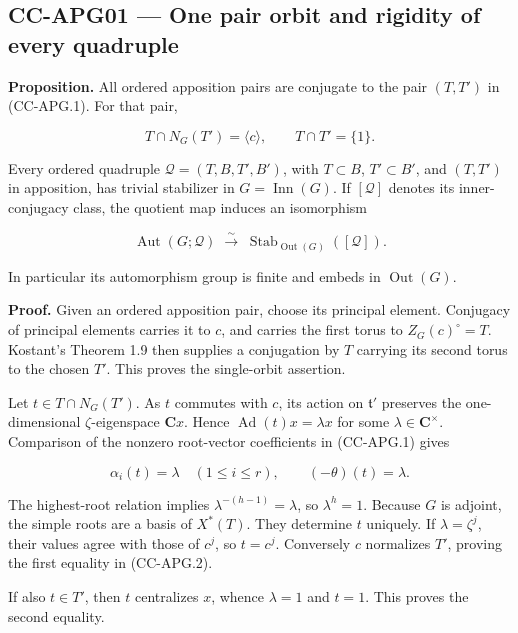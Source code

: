 \documentclass[11pt,a4paper]{article}
\theoremstyle{definition}\newtheorem{definition}[theorem]{Definition}
\theoremstyle{remark}\newtheorem{remark}[theorem]{Remark}
\begin{document}
\subsection{CC-APG01 --- One pair orbit and rigidity of every
quadruple}\label{cc-apg01-one-pair-orbit-and-rigidity-of-every-quadruple}

\textbf{Proposition.} All ordered apposition pairs are conjugate to the
pair \((T,T')\) in (CC-APG.1). For that pair,

\[
 T\cap N_G(T')=\langle c\rangle,\qquad
 T\cap T'=\{1\}.
 \tag{CC-APG.2}
\]

Every ordered quadruple \(\mathcal Q=(T,B,T',B')\), with \(T\subset B\),
\(T'\subset B'\), and \((T,T')\) in apposition, has trivial stabilizer
in \(G=\operatorname{Inn}(G)\). If \([\mathcal Q]\) denotes its
inner-conjugacy class, the quotient map induces an isomorphism

\[
 \operatorname{Aut}(G;\mathcal Q)
 \;\xrightarrow{\ \sim\ }\;
 \operatorname{Stab}_{\operatorname{Out}(G)}([\mathcal Q]).
 \tag{CC-APG.3}
\]

In particular its automorphism group is finite and embeds in
\(\operatorname{Out}(G)\).

\textbf{Proof.} Given an ordered apposition pair, choose its principal
element. Conjugacy of principal elements carries it to \(c\), and
carries the first torus to \(Z_G(c)^\circ=T\). Kostant's Theorem 1.9
then supplies a conjugation by \(T\) carrying its second torus to the
chosen \(T'\). This proves the single-orbit assertion.

Let \(t\in T\cap N_G(T')\). As \(t\) commutes with \(c\), its action on
\(\mathfrak t'\) preserves the one-dimensional \(\zeta\)-eigenspace
\(\mathbf Cx\). Hence \(\operatorname{Ad}(t)x=\lambda x\) for some
\(\lambda\in\mathbf C^\times\). Comparison of the nonzero root-vector
coefficients in (CC-APG.1) gives

\[
 \alpha_i(t)=\lambda\quad(1\leq i\leq r),
 \qquad (-\theta)(t)=\lambda.
\]

The highest-root relation implies \(\lambda^{-(h-1)}=\lambda\), so
\(\lambda^h=1\). Because \(G\) is adjoint, the simple roots are a basis
of \(X^*(T)\). They determine \(t\) uniquely. If \(\lambda=\zeta^j\),
their values agree with those of \(c^j\), so \(t=c^j\). Conversely \(c\)
normalizes \(T'\), proving the first equality in (CC-APG.2).

If also \(t\in T'\), then \(t\) centralizes \(x\), whence \(\lambda=1\)
and \(t=1\). This proves the second equality.
\end{document}

